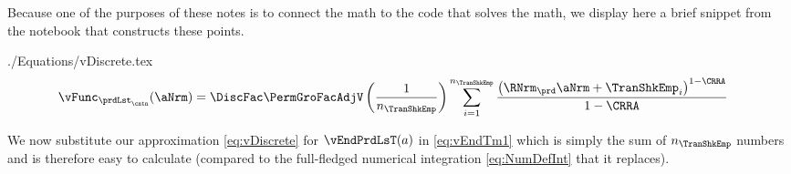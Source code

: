 \documentclass[\econtexRoot/SolvingMicroDSOPs]{subfiles}
\begin{document}
Because one of the purposes of these notes is to connect the math to the code that solves the math, we display here a brief snippet from the notebook that constructs these points.


\lstset{basicstyle=\ttfamily\footnotesize,breaklines=true,language=Python,frame=single}
\nopagebreak

\begin{verbatimwrite}{./Equations/vDiscrete.tex}
  \begin{equation}\begin{gathered}\begin{aligned}
        \vFunc_{{\prdLst}_\cntn}(\aNrm)  & =   \DiscFac \PermGroFacAdjV\left(\frac{1}{n_{\TranShkEmp}}\right)\sum_{i=1}^{n_{\TranShkEmp}}   \frac{\left(\RNrm_{\prd} \aNrm + \TranShkEmp_{i}\right)^{1-\CRRA}}{1-\CRRA} \label{eq:vDiscrete}
      \end{aligned}\end{gathered}\end{equation}
\end{verbatimwrite}

We now substitute our approximation \eqref{eq:vDiscrete} for $\vEndPrdLsT(a)$ in \eqref{eq:vEndTm1} which is simply the sum of $n_{\TranShkEmp}$ numbers and is therefore easy to calculate (compared to the full-fledged numerical integration \eqref{eq:NumDefInt} that it replaces).

\unskip


\end{document}

